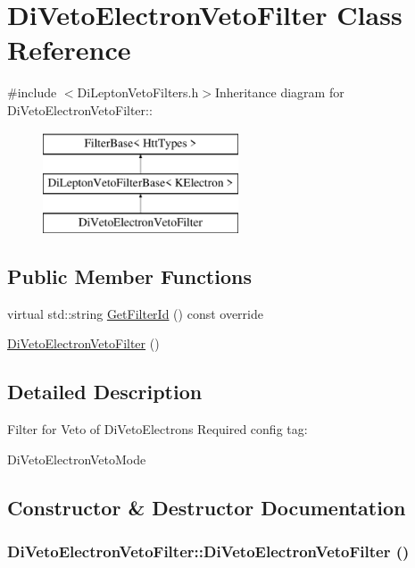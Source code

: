 \hypertarget{classDiVetoElectronVetoFilter}{
\section{DiVetoElectronVetoFilter Class Reference}
\label{classDiVetoElectronVetoFilter}
}


{\ttfamily \#include $<$DiLeptonVetoFilters.h$>$}Inheritance diagram for DiVetoElectronVetoFilter::\begin{figure}[H]
\begin{center}
\leavevmode
\includegraphics[height=3cm]{classDiVetoElectronVetoFilter}
\end{center}
\end{figure}
\subsection*{Public Member Functions}
\begin{DoxyCompactItemize}
\item 
virtual std::string \hyperlink{classDiVetoElectronVetoFilter_a934bd59f2ff487fb7346ea560d4ab134}{GetFilterId} () const override
\item 
\hyperlink{classDiVetoElectronVetoFilter_a17faacb4c6e613e18ae9473a43d65a16}{DiVetoElectronVetoFilter} ()
\end{DoxyCompactItemize}


\subsection{Detailed Description}
Filter for Veto of DiVetoElectrons Required config tag:
\begin{DoxyItemize}
\item DiVetoElectronVetoMode 
\end{DoxyItemize}

\subsection{Constructor \& Destructor Documentation}
\hypertarget{classDiVetoElectronVetoFilter_a17faacb4c6e613e18ae9473a43d65a16}{
\subsubsection[{DiVetoElectronVetoFilter}]{\setlength{\rightskip}{0pt plus 5cm}DiVetoElectronVetoFilter::DiVetoElectronVetoFilter ()}}
\label{classDiVetoElectronVetoFilter_a17faacb4c6e613e18ae9473a43d65a16}


